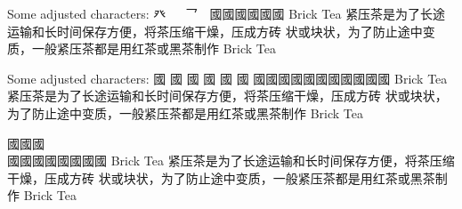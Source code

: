 
\FPmul{}%
\FPmul{}\begin{multicols}{2}
Some adjusted characters:
{\cjk{}
{\cnxBabel{}癶\cjkgGlue}
{\cnxJzr{}\cjkgGlue}
{\cjkgGlue}
{乛\cjkgGlue}
{\cjkgGlue}
國國國國國國} Brick Tea {\cjk{}紧压茶是为了长途运输和长时间保存方便，将茶压缩干燥，压成方砖
状或块状，为了防止途中变质，一般紧压茶都是用红茶或黑茶制作} Brick Tea
\end{multicols}\begin{multicols}{2}
Some adjusted characters:
{\cjk{}國
國
國
國
國
國
國國國國國國國國國國國} Brick Tea {\cjk{}紧压茶是为了长途运输和长时间保存方便，将茶压缩干燥，压成方砖
状或块状，为了防止途中变质，一般紧压茶都是用红茶或黑茶制作} Brick Tea
\end{multicols}\begin{multicols}{2}
{\cjk{}國國國}\\{\cjk{}國國國國國國國國} Brick Tea {\cjk{}紧压茶是为了长途运输和长时间保存方便，将茶压缩干燥，压成方砖
状或块状，为了防止途中变质，一般紧压茶都是用红茶或黑茶制作} Brick Tea
\end{multicols}
